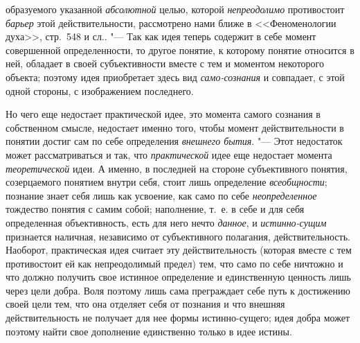 {{образуемого указанной {\em абсолютной}
целью, которой
{\em непреодолимо}
противостоит {\em барьер}
этой действительности, рассмотрено нами ближе в
<<Феноменологии духа>>, стр.~548 и
сл..
"--- Так как идея теперь содержит в себе момент совершенной
определенности, то другое понятие, к которому понятие относится в ней,
обладает в своей субъективности вместе с тем и моментом некоторого объекта;
поэтому идея приобретает здесь вид
{\em само-сознания}
и совпадает, с этой одной стороны, с изображением
последнего.

Но чего еще недостает практической идее, это момента самого
сознания в собственном
смысле,
недостает именно того, чтобы момент действительности в
понятии достиг сам по себе определения
{\em внешнего бытия}. "---
Этот недостаток может рассматриваться и так, что
{\em практической} идее
еще недостает момента
{\em теоретической} идеи.
А именно, в последней на стороне субъективного понятия, созерцаемого
понятием внутри себя, стоит лишь определение
{\em всеобщности};
познание знает себя лишь как усвоение, как само по себе
{\em неопределенное}
тождество понятия с самим собой; наполнение, т.~е. в себе и
для себя определенная объективность, есть для него нечто
{\em данное}, и
{\em истинно-сущим}
признается наличная, независимо от субъективного полагания,
действительность. Наоборот, практическая идея считает эту действительность
(которая вместе с тем противостоит ей как непреодолимый предел) тем, что
само по себе ничтожно и что должно получить свое истинное определение и
единственную ценность лишь через цели добра. Воля поэтому лишь сама
преграждает себе путь к достижению своей цели тем, что она отделяет себя от
познания и что внешняя действительность не получает для нее формы
истинно-сущего; идея добра может поэтому найти свое дополнение единственно
только в идее истины.

}}
